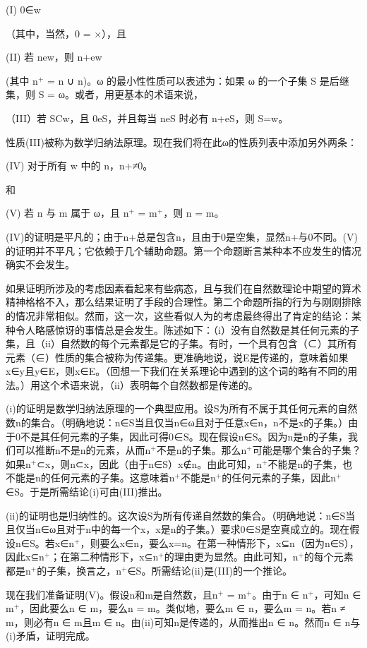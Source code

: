 \documentclass[12pt,a4paper]{ctexbook}
\theoremstyle{definition}
\theoremstyle{remark}
\begin{document}
{(I) 0∈w

（其中，当然，0 = ×），且

(II) 若 new，则 n+ew

(其中 n$^{+}$ = n ∪ {n})。ω 的最小性性质可以表述为：如果 ω 的一个子集 S 是后继集，则 S = ω。或者，用更基本的术语来说，

（III）若 SCw，且 0eS，并且每当 neS 时必有 n+eS，则 S=w。

性质(III)被称为数学归纳法原理。现在我们将在此ω的性质列表中添加另外两条：

(IV) 对于所有 w 中的 n，n+≠0。

和

(V) 若 n 与 m 属于 ω，且 n$^{+}$ = m$^{+}$，则 n = m。

(IV)的证明是平凡的；由于n+总是包含n，且由于0是空集，显然n+与0不同。(V)的证明并不平凡；它依赖于几个辅助命题。第一个命题断言某种本不应发生的情况确实不会发生。

如果证明所涉及的考虑因素看起来有些病态，且与我们在自然数理论中期望的算术精神格格不入，那么结果证明了手段的合理性。第二个命题所指的行为与刚刚排除的情况非常相似。然而，这一次，这些看似人为的考虑最终得出了肯定的结论：某种令人略感惊讶的事情总是会发生。陈述如下：（i）没有自然数是其任何元素的子集，且（ii）自然数的每个元素都是它的子集。有时，一个具有包含（⊂）其所有元素（∈）性质的集合被称为传递集。更准确地说，说E是传递的，意味着如果x∈y且y∈E，则x∈E。（回想一下我们在关系理论中遇到的这个词的略有不同的用法。）用这个术语来说，（ii）表明每个自然数都是传递的。

(i)的证明是数学归纳法原理的一个典型应用。设S为所有不属于其任何元素的自然数n的集合。（明确地说：n∈S当且仅当n∈ω且对于任意x∈n，n不是x的子集。）由于0不是其任何元素的子集，因此可得0∈S。现在假设n∈S。因为n是n的子集，我们可以推断n不是n的元素，从而n$^{+}$不是n的子集。那么n$^{+}$可能是哪个集合的子集？如果n$^{+}$⊂x，则n⊂x，因此（由于n∈S）x∉n。由此可知，n$^{+}$不能是n的子集，也不能是n的任何元素的子集。这意味着n$^{+}$不能是n$^{+}$的任何元素的子集，因此n$^{+}$∈S。于是所需结论(i)可由(III)推出。

(ii)的证明也是归纳性的。这次设S为所有传递自然数的集合。（明确地说：n∈S当且仅当n∈ω且对于n中的每一个x，x是n的子集。）要求0∈S是空真成立的。现在假设n∈S。若x∈n$^{+}$，则要么x∈n，要么x=n。在第一种情形下，x⊆n（因为n∈S），因此x⊆n$^{+}$；在第二种情形下，x⊆n$^{+}$的理由更为显然。由此可知，n$^{+}$的每个元素都是n$^{+}$的子集，换言之，n$^{+}$∈S。所需结论(ii)是(III)的一个推论。

现在我们准备证明(V)。假设n和m是自然数，且n$^{+}$ = m$^{+}$。由于n ∈ n$^{+}$，可知n ∈ m$^{+}$，因此要么n ∈ m，要么n = m。类似地，要么m ∈ n，要么m = n。若n ≠ m，则必有n ∈ m且m ∈ n。由(ii)可知n是传递的，从而推出n ∈ n。然而n ∈ n与(i)矛盾，证明完成。

}
\end{document}

